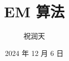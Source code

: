 \documentclass{beamer}
\title{EM 算法}
\author{祝润天}
\institute{复旦大学计算机科学技术学院}
\date{2024 年 12 月 6 日}
\begin{document}
\begin{frame}
    
    \maketitle

\end{frame}
\end{document}
